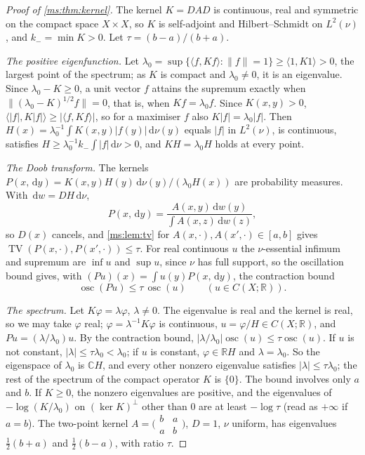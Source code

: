 \documentclass[11pt,a4paper]{amsart}
\theoremstyle{definition}
\theoremstyle{remark}
\numberwithin{equation}{section}
\DeclareMathOperator{\TV}{TV}        %
\DeclareMathOperator{\osc}{osc}      %
\newcommand{\R}{\mathbb{R}}          %
\newcommand{\C}{\mathbb{C}}          %
\newcommand{\ip}[2]{\langle #1,#2\rangle}  %
\newcommand{\norm}[1]{\lVert #1\rVert}     %
\newcommand{\abs}[1]{\lvert #1\rvert}      %
\newcommand{\dd}{\,\mathrm{d}}             %
\begin{document}
\begin{proof}[Proof of \cref{ms:thm:kernel}]
The kernel $K=DAD$ is continuous, real and symmetric on the compact space $X\times X$, so $K$ is self-adjoint and Hilbert--Schmidt on $L^2(\nu)$, and $k_-=\min K>0$. Let $\tau=(b-a)/(b+a)$.

\emph{The positive eigenfunction.} Let $\lambda_0=\sup\{\ip{f}{Kf}:\norm f=1\}\ge\ip{1}{K1}>0$, the largest point of the spectrum; as $K$ is compact and $\lambda_0\ne0$, it is an eigenvalue. Since $\lambda_0-K\ge0$, a unit vector $f$ attains the supremum exactly when $\norm{(\lambda_0-K)^{1/2}f}=0$, that is, when $Kf=\lambda_0f$. Since $K(x,y)>0$, $\ip{\abs f}{K\abs f}\ge\abs{\ip{f}{Kf}}$, so for a maximiser $f$ also $K\abs f=\lambda_0\abs f$. Then $H(x)=\lambda_0^{-1}\int K(x,y)\abs{f(y)}\dd\nu(y)$ equals $\abs f$ in $L^2(\nu)$, is continuous, satisfies $H\ge\lambda_0^{-1}k_-\int\abs f\dd\nu>0$, and $KH=\lambda_0H$ holds at every point.

\emph{The Doob transform.} The kernels $P(x,\dd y)=K(x,y)H(y)\dd\nu(y)/(\lambda_0H(x))$ are probability measures. With $\dd w=DH\dd\nu$,
\[
P(x,\dd y)=\frac{A(x,y)\dd w(y)}{\int A(x,z)\dd w(z)},
\]
so $D(x)$ cancels, and \cref{ms:lem:tv} for $A(x,\cdot),A(x',\cdot)\in[a,b]$ gives $\TV(P(x,\cdot),P(x',\cdot))\le\tau$. For real continuous $u$ the $\nu$-essential infimum and supremum are $\inf u$ and $\sup u$, since $\nu$ has full support, so the oscillation bound gives, with $(Pu)(x)=\int u(y)P(x,\dd y)$, the contraction bound
\[
\osc(Pu)\le\tau\,\osc(u)\qquad(u\in C(X;\R)).
\]

\emph{The spectrum.} Let $K\varphi=\lambda\varphi$, $\lambda\ne0$. The eigenvalue is real and the kernel is real, so we may take $\varphi$ real; $\varphi=\lambda^{-1}K\varphi$ is continuous, $u=\varphi/H\in C(X;\R)$, and $Pu=(\lambda/\lambda_0)u$. By the contraction bound, $\abs{\lambda/\lambda_0}\osc(u)\le\tau\osc(u)$. If $u$ is not constant, $\abs\lambda\le\tau\lambda_0<\lambda_0$; if $u$ is constant, $\varphi\in\R H$ and $\lambda=\lambda_0$. So the eigenspace of $\lambda_0$ is $\C H$, and every other nonzero eigenvalue satisfies $\abs\lambda\le\tau\lambda_0$; the rest of the spectrum of the compact operator $K$ is $\{0\}$. The bound involves only $a$ and $b$. If $K\ge0$, the nonzero eigenvalues are positive, and the eigenvalues of $-\log(K/\lambda_0)$ on $(\ker K)^\perp$ other than $0$ are at least $-\log\tau$ (read as $+\infty$ if $a=b$). The two-point kernel $A=\bigl(\begin{smallmatrix}b&a\\a&b\end{smallmatrix}\bigr)$, $D=1$, $\nu$ uniform, has eigenvalues $\frac12(b+a)$ and $\frac12(b-a)$, with ratio $\tau$.
\end{proof}
\end{document}
